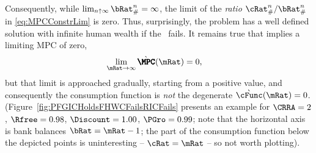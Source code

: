\documentclass[\econtexRoot/BufferStockTheory]{subfiles}
\begin{document}
Consequently, while $\lim_{n \uparrow \infty} \bRat_{\#}^{n} = \infty$, the limit of the \textit{ratio} $\cRat_{\#}^{n}/\bRat_{\#}^{n}$ in \eqref{eq:MPCConstrLim} is zero.
Thus, surprisingly, the problem has a well defined solution with
infinite human wealth if the \RIC~fails.  It remains true that \cncl{\RIC}
implies a limiting MPC of zero,
\begin{equation}\begin{gathered}\begin{aligned}
  \lim_{\mRat \rightarrow \infty} \grave{\pmb{\MPC}}(\mRat)   & = 0,
\end{aligned}\end{gathered}\end{equation}
but that limit is approached gradually, starting from a positive
value, and consequently the consumption function is {\it not} the
degenerate $\grave{\cFunc}(\mRat)=0$.  (Figure~\ref{fig:PFGICHoldsFHWCFailsRICFails} presents an example for $\CRRA=2$, $\Rfree=0.98$, $\Discount = 1.00$, $\PGro = 0.99$; note that the horizontal axis is bank balances $\bRat = \mRat-1$; the part of the consumption function below the depicted points is uninteresting -- $\cRat = \mRat$ -- so not worth plotting).


% 

\end{document}
